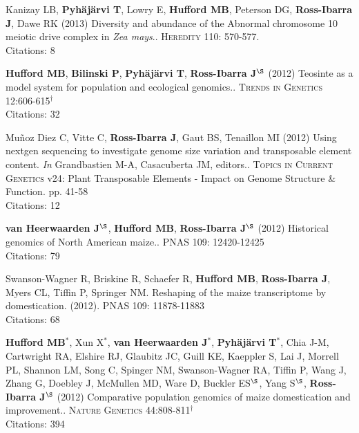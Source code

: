 \documentclass[letterpaper,10pt]{article}
\begin{document}
\begin{etaremune}
\item Kanizay LB, {\bf Pyh\"aj\"arvi T}, Lowry E, {\bf Hufford MB}, Peterson DG, {\bf Ross-Ibarra J}, Dawe RK (2013) Diversity and abundance of the Abnormal chromosome 10 meiotic drive complex in \emph{Zea mays}.. \textsc{Heredity} 110: 570-577.
\\Citations: 8\\


\item {\bf Hufford MB}, {\bf Bilinski P}, {\bf Pyh\"aj\"arvi T}, {\bf Ross-Ibarra J}$^\S$ (2012) Teosinte as a model system for population and ecological genomics.. \textsc{Trends in Genetics} 12:606-615$^\dagger$
\\Citations: 32\\


\item Mu\~{n}oz Diez C, Vitte C, {\bf Ross-Ibarra J}, Gaut BS, Tenaillon MI (2012) Using nextgen sequencing to investigate genome size variation and transposable element content. \emph{In} Grandbastien M-A, Casacuberta JM, editors.. \textsc{Topics in Current Genetics} v24: Plant Transposable Elements - Impact on Genome Structure \& Function. pp. 41-58
\\Citations: 12\\


\item  {\bf van Heerwaarden J}$^\S$, {\bf Hufford MB}, {\bf Ross-Ibarra J}$^\S$ (2012) Historical genomics of North American maize.. \textsc{PNAS} 109: 12420-12425
\\Citations: 79\\


\item Swanson-Wagner R, Briskine R, Schaefer R, {\bf Hufford MB}, {\bf Ross-Ibarra J}, Myers CL, Tiffin P, Springer NM.  Reshaping of the maize transcriptome by domestication. (2012). \textsc{PNAS}  109: 11878-11883
\\Citations: 68\\


\item {\bf Hufford MB}$^*$, Xun X$^*$, {\bf van Heerwaarden J}$^*$, {\bf Pyh\"aj\"arvi T}$^*$, Chia J-M, Cartwright RA, Elshire RJ, Glaubitz JC, Guill KE, Kaeppler S, Lai J, Morrell PL, Shannon LM, Song C, Spinger NM, Swanson-Wagner RA, Tiffin P, Wang J, Zhang G, Doebley J, McMullen MD, Ware D, Buckler ES$^\S$, Yang S$^\S$, {\bf Ross-Ibarra J}$^\S$ (2012) Comparative population genomics of maize domestication and improvement.. \textsc{Nature Genetics} 44:808-811$^\dagger$
\\Citations: 394\\



\end{etaremune}
\end{document}
